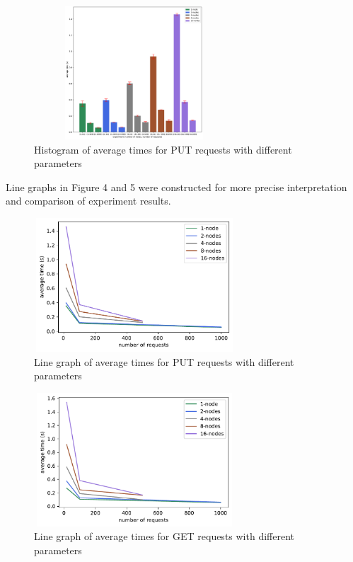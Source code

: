 \documentclass[
    a4paper,
    twocolumn,
]{article}
\begin{document}
\setlength{\intextsep}{5pt plus 2pt minus 0pt}
\begin{figure}[!ht]
	\centering
	\includegraphics[width=7.5cm, height=5cm]{put.pdf}
	\caption{Histogram of average times for PUT requests with different parameters}
\end{figure}

Line graphs in Figure 4 and 5 were constructed for more precise interpretation and comparison of experiment results.\\

\setlength{\intextsep}{7pt plus 2pt minus 0pt}
\begin{figure}[!ht]
	\centering
	\includegraphics[width=7.5cm, height=5cm]{put_line.pdf}
	\caption{Line graph of average times for PUT requests with different parameters}
\end{figure}

\setlength{\intextsep}{5pt plus 2pt minus 0pt}
\begin{figure}[!ht]
	\centering
	\includegraphics[width=7.5cm, height=5cm]{get_line.pdf}
	\caption{Line graph of average times for GET requests with different parameters}
\end{figure}
\end{document}
